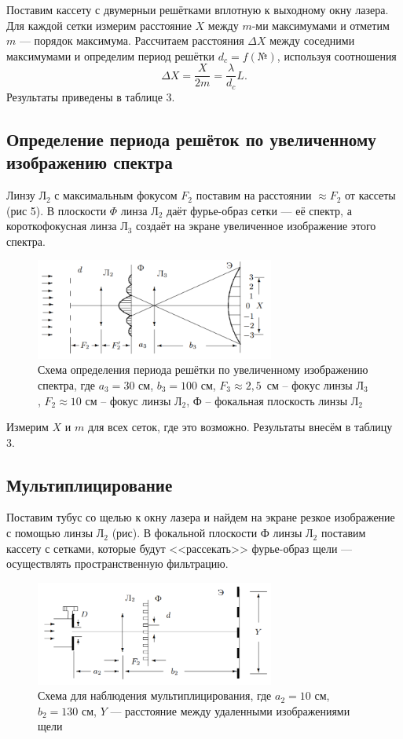 \documentclass[a4paper]{article}
\begin{document}
Поставим кассету с двумерныи решётками вплотную к выходному окну лазера. Для каждой сетки измерим расстояние $X$ между $m$-ми максимумами и отметим $m$ --- порядок максимума. Рассчитаем расстояния $\Delta X$ между соседними максимумами и определим период решётки $d_c = f(\text{№})$, используя соотношения
$$\Delta X = \frac{X}{2m} = \frac{\lambda}{d_c}L.$$
Результаты приведены в таблице 3.

\subsection{Определение периода решёток по увеличенному изображению спектра}

Линзу Л$_2$ с максимальным фокусом $F_2$ поставим на расстоянии $\approx F_2$ от кассеты (рис 5). В плоскости $\Phi$ линза Л$_2$ даёт фурье-образ сетки --- её спектр, а короткофокусная линза Л$_3$ создаёт на экране увеличенное изображение этого спектра. 

\begin{figure}[h!]
    \centering
    \includegraphics[width = 0.7\textwidth]{image/scheme3.png}
    \caption{Схема определения периода решётки по увеличенному изображению спектра, где $a_3 = 30$ см, $b_3 = 100$ см, $F_3 \approx 2,5$~см -- фокус линзы Л$_3$, $F_2 \approx 10$ см -- фокус линзы Л$_2$, Ф -- фокальная плоскость линзы Л$_2$}
\end{figure}


\noindent Измерим $X$ и $m$ для всех сеток, где это возможно. Результаты внесём в таблицу 3.

\subsection{Мультиплицирование}

Поставим тубус со щелью к окну лазера и найдем на экране резкое изображение с помощью линзы Л$_2$ (рис). В фокальной плоскости Ф линзы Л$_2$ поставим кассету с сетками, которые будут <<рассекать>> фурье-образ щели --- осуществлять пространственную фильтрацию.

\begin{figure}[h!]
    \centering
    \includegraphics[width = 0.7\textwidth]{image/scheme4.png}
    \caption{Схема для наблюдения мультиплицирования, где $a_2 = 10$ см, $b_2 = 130$ см, $Y$ --- расстояние между удаленными изображениями щели}
\end{figure}
\end{document}
